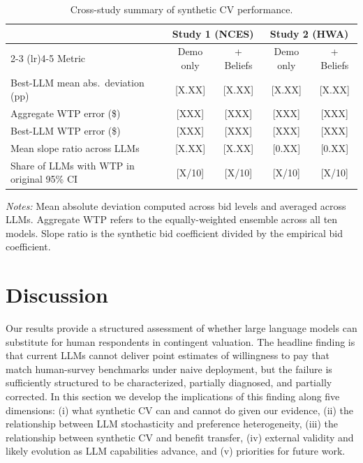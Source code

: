 \documentclass[12pt]{article}
\begin{document}
\begin{table}[h]
    \centering
    \caption{Cross-study summary of synthetic CV performance.}
    \label{tab:cross-study}
    \begin{threeparttable}
    \begin{tabular}{lcccc}
        \toprule
         & \multicolumn{2}{c}{Study 1 (NCES)} & \multicolumn{2}{c}{Study 2 (HWA)} \\
        \cmidrule(lr){2-3} \cmidrule(lr){4-5}
        Metric & Demo only & + Beliefs & Demo only & + Beliefs \\
        \midrule
        Best-LLM mean abs.\ deviation (pp)        & [X.XX] & [X.XX] & [X.XX] & [X.XX] \\
        Aggregate WTP error (\$)                  & [XXX]  & [XXX]  & [XXX]  & [XXX]  \\
        Best-LLM WTP error (\$)                   & [XXX]  & [XXX]  & [XXX]  & [XXX]  \\
        Mean slope ratio across LLMs              & [X.XX] & [X.XX] & [0.XX] & [0.XX] \\
        Share of LLMs with WTP in original 95\% CI & [X/10] & [X/10] & [X/10] & [X/10] \\
        \bottomrule
    \end{tabular}
    \begin{tablenotes}\footnotesize
    \item \textit{Notes:} Mean absolute deviation computed across bid levels and averaged across LLMs. Aggregate WTP refers to the equally-weighted ensemble across all ten models. Slope ratio is the synthetic bid coefficient divided by the empirical bid coefficient.
    \end{tablenotes}
    \end{threeparttable}
\end{table}



\section{Discussion}\label{sec:discussion}

Our results provide a structured assessment of whether large language models can substitute for human respondents in contingent valuation. The headline finding is that current LLMs cannot deliver point estimates of willingness to pay that match human-survey benchmarks under naive deployment, but the failure is sufficiently structured to be characterized, partially diagnosed, and partially corrected. In this section we develop the implications of this finding along five dimensions: (i) what synthetic CV can and cannot do given our evidence, (ii) the relationship between LLM stochasticity and preference heterogeneity, (iii) the relationship between synthetic CV and benefit transfer, (iv) external validity and likely evolution as LLM capabilities advance, and (v) priorities for future work.
\end{document}
